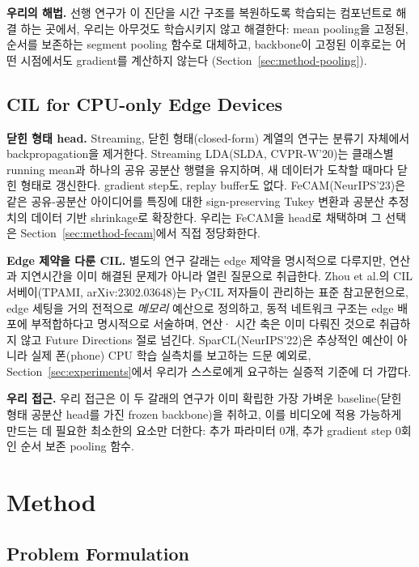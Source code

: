 \documentclass[11pt]{article}
\begin{document}
\textbf{우리의 해법.} 선행 연구가 이 진단을 시간 구조를 복원하도록 학습되는 컴포넌트로 해결
하는 곳에서, 우리는 아무것도 학습시키지 않고 해결한다: mean pooling을
고정된, 순서를 보존하는 segment pooling 함수로 대체하고, backbone이
고정된 이후로는 어떤 시점에서도 gradient를 계산하지 않는다
(Section~\ref{sec:method-pooling}).

\subsection{CIL for CPU-only Edge Devices}

\textbf{닫힌 형태 head.} Streaming, 닫힌 형태(closed-form) 계열의 연구는 분류기 자체에서
backpropagation을 제거한다. Streaming LDA(SLDA, CVPR-W'20)는 클래스별
running mean과 하나의 공유 공분산 행렬을 유지하며, 새 데이터가 도착할
때마다 닫힌 형태로 갱신한다. gradient step도, replay buffer도 없다.
FeCAM(NeurIPS'23)은 같은 공유-공분산 아이디어를 특징에 대한
sign-preserving Tukey 변환과 공분산 추정치의 데이터 기반 shrinkage로
확장한다. 우리는 FeCAM을 head로 채택하며 그 선택은
Section~\ref{sec:method-fecam}에서 직접 정당화한다.

\textbf{Edge 제약을 다룬 CIL.} 별도의 연구 갈래는 edge 제약을 명시적으로 다루지만, 연산과 지연시간을
이미 해결된 문제가 아니라 열린 질문으로 취급한다. Zhou et al.의 CIL
서베이(TPAMI, arXiv:2302.03648)는 PyCIL 저자들이 관리하는 표준
참고문헌으로, edge 세팅을 거의 전적으로 \emph{메모리} 예산으로 정의하고,
동적 네트워크 구조는 edge 배포에 부적합하다고 명시적으로 서술하며, 연산·
시간 축은 이미 다뤄진 것으로 취급하지 않고 Future Directions 절로
넘긴다. SparCL(NeurIPS'22)은 추상적인 예산이 아니라 실제 폰(phone) CPU
학습 실측치를 보고하는 드문 예외로, Section~\ref{sec:experiments}에서 우리가
스스로에게 요구하는 실증적 기준에 더 가깝다.

\textbf{우리 접근.} 우리 접근은 이 두 갈래의 연구가 이미 확립한 가장 가벼운 baseline(닫힌
형태 공분산 head를 가진 frozen backbone)을 취하고, 이를 비디오에 적용
가능하게 만드는 데 필요한 최소한의 요소만 더한다: 추가 파라미터 0개,
추가 gradient step 0회인 순서 보존 pooling 함수.


\section{Method}
\label{sec:method}

\subsection{Problem Formulation}
\label{sec:method-formulation}
\end{document}
